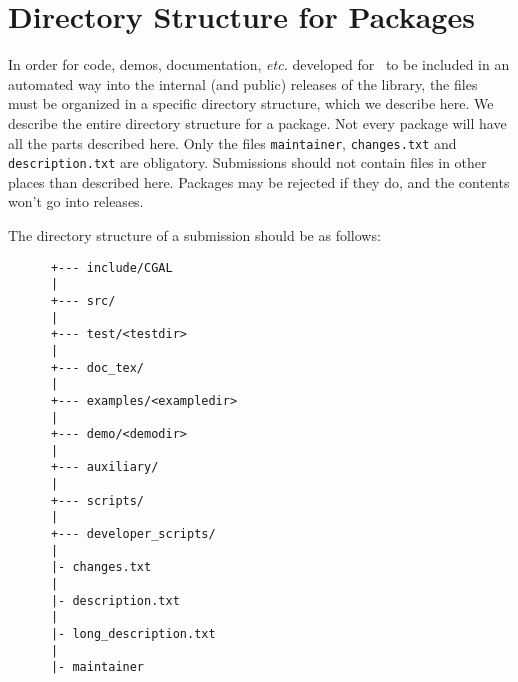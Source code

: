 
\chapter{Directory Structure for Packages}
\label{chap:directory_structure}

In order for code, demos, documentation, {\em etc.} developed for \cgal\ to 
be included in an automated way into the internal (and public) releases of the 
library, the files must be organized in a specific directory structure, which 
we describe here.  We describe the entire directory structure for a package. 
Not every package will have all the parts described here. Only the files
{\tt maintainer}, {\tt changes.txt} and {\tt description.txt} 
are obligatory.
Submissions should not contain files in other places than described here.
Packages may be rejected if they do, and the contents won't go into releases.

The directory structure of a submission should be as follows: 

\begin{verbatim}
      +--- include/CGAL
      |
      +--- src/
      |
      +--- test/<testdir>
      |
      +--- doc_tex/
      |
      +--- examples/<exampledir>
      |
      +--- demo/<demodir>
      |
      +--- auxiliary/
      |
      +--- scripts/
      |
      +--- developer_scripts/
      |
      |- changes.txt
      |
      |- description.txt
      |
      |- long_description.txt
      |
      |- maintainer
\end{verbatim}


